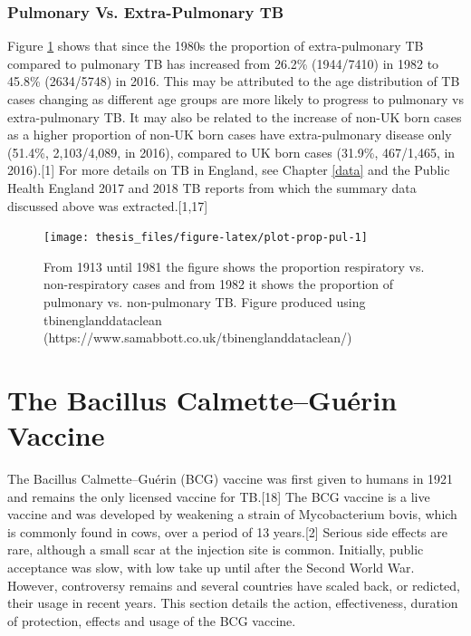 \documentclass[11pt,twoside]{bristolthesis}
\begin{document}
  \hypertarget{pulmonary-vs.-extra-pulmonary-tb}{%
  \subsubsection{Pulmonary Vs. Extra-Pulmonary TB}\label{pulmonary-vs.-extra-pulmonary-tb}}
  
  Figure \ref{fig:plot-prop-pul} shows that since the 1980s the proportion of extra-pulmonary TB compared to pulmonary TB has increased from 26.2\% (1944/7410) in 1982 to 45.8\% (2634/5748) in 2016. This may be attributed to the age distribution of TB cases changing as different age groups are more likely to progress to pulmonary vs extra-pulmonary TB. It may also be related to the increase of non-UK born cases as a higher proportion of non-UK born cases have extra-pulmonary disease only (51.4\%, 2,103/4,089, in 2016), compared to UK born cases (31.9\%, 467/1,465, in 2016).{[}1{]} For more details on TB in England, see Chapter \ref{data} and the Public Health England 2017 and 2018 TB reports from which the summary data discussed above was extracted.{[}1,17{]}
  \begin{figure}
  
  {\centering \texttt{[image: thesis\_files/figure-latex/plot-prop-pul-1]} 
  
  }
  
  \caption{From 1913 until 1981 the figure shows the proportion respiratory vs. non-respiratory cases and from 1982 it shows the proportion of pulmonary vs. non-pulmonary TB. Figure produced using tbinenglanddataclean (https://www.samabbott.co.uk/tbinenglanddataclean/)}\label{fig:plot-prop-pul}
  \end{figure}
  \hypertarget{the-bacillus-calmetteguerin-vaccine}{%
  \section{The Bacillus Calmette--Guérin Vaccine}\label{the-bacillus-calmetteguerin-vaccine}}
  
  The Bacillus Calmette--Guérin (BCG) vaccine was first given to humans in 1921 and remains the only licensed vaccine for TB.{[}18{]} The BCG vaccine is a live vaccine and was developed by weakening a strain of Mycobacterium bovis, which is commonly found in cows, over a period of 13 years.{[}2{]} Serious side effects are rare, although a small scar at the injection site is common. Initially, public acceptance was slow, with low take up until after the Second World War. However, controversy remains and several countries have scaled back, or redicted, their usage in recent years. This section details the action, effectiveness, duration of protection, effects and usage of the BCG vaccine.
  
\end{document}
